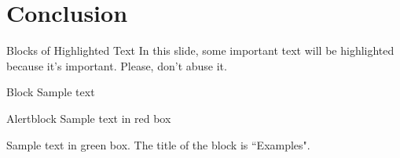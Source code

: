 \documentclass[aspectratio=169,xcolor=dvipsnames]{beamer}
\begin{document}
\section{Conclusion}




\begin{frame}{Blocks of Highlighted Text}
    In this slide, some important text will be \alert{highlighted} because it's important. Please, don't abuse it.

    \begin{block}{Block}
        Sample text
    \end{block}

    \begin{alertblock}{Alertblock}
        Sample text in red box
    \end{alertblock}

    \begin{examples}
        Sample text in green box. The title of the block is ``Examples".
    \end{examples}
\end{frame}

\end{document}
